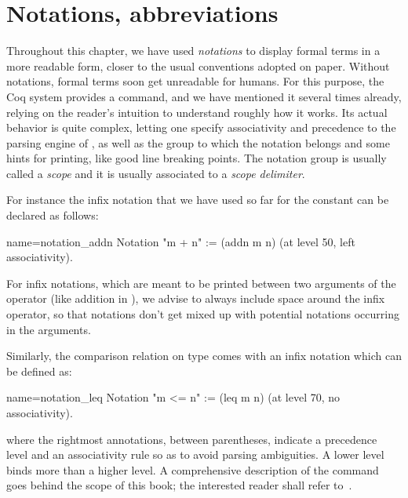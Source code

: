 \section{Notations, abbreviations}\label{sec:notabrev}

Throughout this chapter, we have used \emph{notations} to display
formal terms in a more readable form, closer to the usual conventions
adopted on paper. Without notations, formal terms soon get unreadable for
humans. For this purpose, the Coq{} system provides a 
command, and we have mentioned it several times already,  relying on the
reader's intuition to understand roughly how it works. Its actual
behavior is quite complex, letting one specify associativity and
precedence to the parsing engine of \Coq{}, as well as the group to
which the notation belongs and some hints for printing, like good
line breaking points.  The notation group is usually called a
{\em scope} and it is usually associated to a {\em scope delimiter}.

For instance the infix notation that we have used so far for the
constant  can be declared as follows:

\begin{coq}{name=notation_addn}{}
Notation "m + n" := (addn m n) (at level 50, left associativity).
\end{coq}

For infix notations, which are meant to be printed between two arguments
of the operator (like addition in ), we advise to always include
space around the infix operator, so that notations don't get mixed up with
potential notations occurring in the arguments.


Similarly, the comparison relation  on type  comes with
an infix notation \C{<=} which can be defined as:

\begin{coq}{name=notation_leq}{}
Notation "m <= n" := (leq m n) (at level 70, no associativity).
\end{coq}

where the rightmost annotations, between parentheses, indicate a
precedence level and an associativity rule so as to avoid parsing
ambiguities. A lower level binds more than a higher level. A comprehensive
description of the  command goes behind the scope of this
book; the interested reader shall refer to~\cite[chapter 12]{Coq:manual}.

